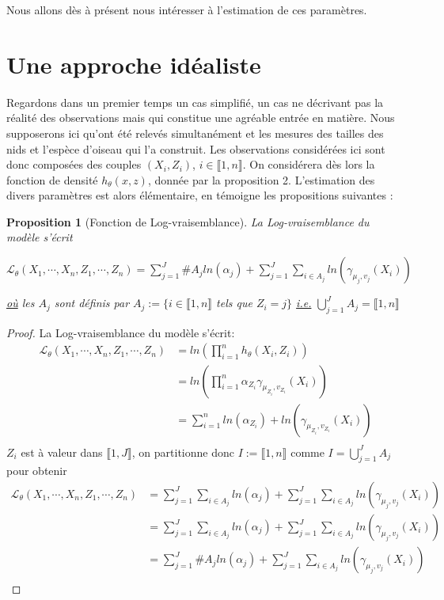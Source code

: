 \documentclass[frenchb]{report}
\newcommand{\1}{\mathbbm{1}}
\newtheorem{prop}{Proposition}
\theoremstyle{definition}\newtheorem{defn}{Définition}
\theoremstyle{definition}\newtheorem{exm}{Exemple}
\theoremstyle{definition}\newtheorem{nota}{Notation}
\theoremstyle{definition}\newtheorem{rem}{Remarque}
\begin{document}
Nous allons dès à présent nous intéresser à l'estimation de ces paramètres.

\section{Une approche idéaliste}

Regardons dans un premier temps un cas simplifié, un cas ne décrivant pas la réalité des observations mais qui constitue une agréable entrée en matière. \newline
Nous supposerons ici qu'ont été relevés simultanément et les mesures des tailles des nids et l'espèce d'oiseau qui l'a construit. Les observations considérées ici sont donc composées des couples $(X_i, Z_i)$, $i \in \llbracket1,n \rrbracket$. On considérera dès lors la fonction de densité $h_\theta(x,z)$, donnée par la proposition 2. \newline
L'estimation des divers paramètres est alors élémentaire, en témoigne les propositions suivantes :
\begin{prop}[Fonction de Log-vraisemblance]
La Log-vraisemblance du modèle s'écrit
\begin{center} $\mathcal{L}_\theta(X_1, \cdots, X_n, Z_1, \cdots, Z_n) = \displaystyle \sum_{j=1}^J \#A_j ln(\alpha_j) + \sum_{j=1}^J\sum_{i\in A_j}ln(\gamma_{\mu_j, v_j}(X_i))$ \end{center}
\underline{où} les $A_j$ sont définis par $A_j := \{ i\in \llbracket1,n \rrbracket$ tels que $Z_i = j \}$ \underline{i.e.} $\displaystyle\bigcup_{j=1}^J A_j = \llbracket1,n \rrbracket$
\end{prop}

\begin{proof}
La Log-vraisemblance du modèle s'écrit:
\begin{align*}
\mathcal{L}_\theta(X_1, \cdots, X_n, Z_1, \cdots, Z_n) &= ln\left(\displaystyle\prod_{i=1}^n h_\theta(X_i, Z_i) \right)\\
&= ln\left(\displaystyle\prod_{i=1}^n  \alpha_{Z_i}\gamma_{\mu_{Z_i}, v_{Z_i}}(X_i) \right)\\
&= \displaystyle\sum_{i=1}^n ln(\alpha_{Z_i})+ ln(\gamma_{\mu_{Z_i}, v_{Z_i}}(X_i))\\
\end{align*}
$Z_i$ est à valeur dans $\llbracket1,J \rrbracket$, on  partitionne donc $I := \llbracket1,n \rrbracket$ comme $I = \displaystyle\bigcup_{j=1}^J A_j$ pour obtenir
\begin{align*}
\mathcal{L}_\theta(X_1, \cdots, X_n, Z_1, \cdots, Z_n) &=  \displaystyle\sum_{j=1}^J\sum_{i\in A_j} ln(\alpha_{j})+ \sum_{j=1}^J\sum_{i\in A_j} ln(\gamma_{\mu_j, v_j}(X_i))\\
&= \displaystyle\sum_{j=1}^J\sum_{i\in A_j} ln(\alpha_j)+ \sum_{j=1}^J\sum_{i\in A_j} ln(\gamma_{\mu_j, v_j}(X_i)) \\
&= \displaystyle\sum_{j=1}^J \#A_j ln(\alpha_j)+ \sum_{j=1}^J\sum_{i\in A_j} ln(\gamma_{\mu_j, v_j}(X_i)) \\
\end{align*}
\end{proof}
\end{document}
